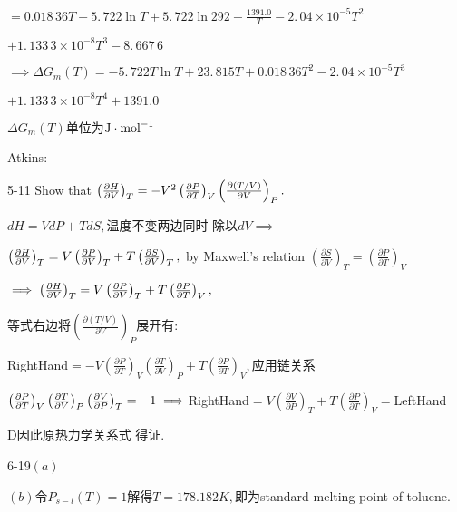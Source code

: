 \documentclass{ctexart}
\begin{document}
$=\allowbreak 0.018\,36T-5.\,\allowbreak 722\ln T+5.\,\allowbreak 722\ln
292+\allowbreak \frac{1391.0}{T}-2.\,\allowbreak 04\times 10^{-5}T^{2}$

$+1.\,\allowbreak 133\,3\times 10^{-8}\allowbreak T^{3}-8.\,\allowbreak
667\,6$

$\implies \Delta G_{m}\left( T\right) =-5.\,\allowbreak 722\allowbreak T\ln
T+\allowbreak 23.\,\allowbreak 815T+0.018\,36T^{2}-2.\,\allowbreak 04\times
10^{-5}T^{3}$

$+1.\,\allowbreak 133\,3\times 10^{-8}T^{4}+\allowbreak 1391.0$

$\Delta G_{m}\left( T\right) $单位为$\unit{J}\cdot \unit{%
mol}^{-1}$

Atkins:

5-11 Show that $\left( \frac{\partial H}{\partial V}\right)
_{T}=-V^{2}\left( \frac{\partial P}{\partial T}\right) _{V}\left( \frac{%
\partial \left( T/V\right) }{\partial V}\right) _{P}.$

$dH=VdP+TdS,$温度不变两边同时%
除以$dV\implies $

$\left( \frac{\partial H}{\partial V}\right) _{T}=V\left( \frac{\partial P}{%
\partial V}\right) _{T}+T\left( \frac{\partial S}{\partial V}\right) _{T},$%
by Maxwell's relation $\left( \frac{\partial S}{\partial V}\right)
_{T}=\left( \frac{\partial P}{\partial T}\right) _{V}$

$\implies \left( \frac{\partial H}{\partial V}\right) _{T}=V\left( \frac{%
\partial P}{\partial V}\right) _{T}+T\left( \frac{\partial P}{\partial T}%
\right) _{V},$

等式右边将$\left( \frac{\partial \left(
T/V\right) }{\partial V}\right) _{P}$展开有:

\bigskip RightHand$=-V\left( \frac{\partial P}{\partial T}\right) _{V}\left( 
\frac{\partial T}{\partial V}\right) _{P}+T\left( \frac{\partial P}{\partial
T}\right) _{V},$应用链关系

$\left( \frac{\partial P}{\partial T}\right) _{V}\left( \frac{\partial T}{%
\partial V}\right) _{P}\left( \frac{\partial V}{\partial P}\right)
_{T}=-1\implies $RightHand$=V\left( \frac{\partial V}{\partial P}\right)
_{T}+T\left( \frac{\partial P}{\partial T}\right) _{V}=$LeftHand

D因此原热力学关系式%
得证.

6-19$\left( a\right) $


$\left( b\right) $令$P_{s-l}\left( T\right) =1$解得\qquad $%
T=178.182\unit{K},$即为standard melting point of toluene.
\end{document}
